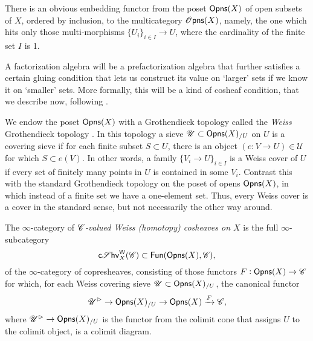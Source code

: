 \documentclass[../text]{subfiles}
\begin{document}
\begin{remark}\label{rem:op_to_op}
    There is an obvious embedding functor from the poset $\opens[r](X)$ of open subsets of $X$, ordered by inclusion, to the multicategory $\opens[s](X)$, namely, the one which hits only those multi-morphisms $\{U_i\}_{i \in I} \rightarrow U$, where the cardinality of the finite set $I$ is 1.
\end{remark}


A factorization algebra will be a prefactorization algebra that further satisfies a certain gluing condition that lets us construct its value on `larger' sets if we know it on `smaller' sets. More formally, this will be a kind of cosheaf condition, that we describe now, following \cite{weiss1999,af_primer}.

We endow the poset $\opens[r](X)$ with a Grothendieck topology called the \emph{Weiss} Grothendieck topology \cite{weiss1999}. In this topology a sieve $\mathscr{U} \subset \opens[r](X)_{/U}$ on $U$ is a covering sieve if for each finite subset $S \subset U$, there is an object $(e: V \rightarrow U) \in \mathscr{U}$ for which $S \subset e(V)$. In other words, a family $\{ V_i \rightarrow U\}_{i \in I}$ is a Weiss cover of $U$ if every set of finitely many points in $U$ is contained in some $V_i$. Contrast this with the standard Grothendieck topology on the poset of opens $\opens[r](X)$, in which instead of a finite set we have a one-element set. Thus, every Weiss cover is a cover in the standard sense, but not necessarily the other way around.

\begin{definition}
    The $\infty$-category of \emph{$\mathscr{C}$-valued Weiss (homotopy) cosheaves on $X$} is the full $\infty$-subcategory
    \begin{equation}
        \csheaves[W]_{X}(\catC) \subset \mathsf{Fun}(\opens[r](X), \catC),
    \end{equation}
    of the $\infty$-category of copresheaves, consisting of those functors $F: \opens[r](X) \rightarrow \catC$ for which, for each Weiss covering sieve $\mathscr{U} \subset \opens[r](X)_{/U}$, the canonical functor
    \begin{equation}
        \mathscr{U}^{\vartriangleright} \rightarrow \opens[r](X)_{/U} \rightarrow \opens[r](X) \xrightarrow{F} \catC,
    \end{equation}
    where $\mathscr{U}^{\vartriangleright} \rightarrow \opens[r](X)_{/U}$ is the functor from the colimit cone that assigns $U$ to the colimit object, is a colimit diagram.
\end{definition}
\end{document}
